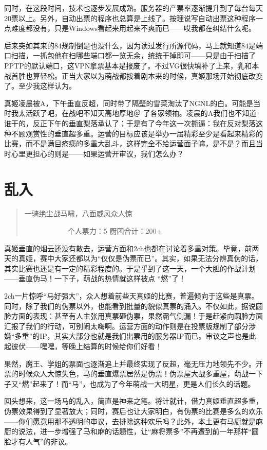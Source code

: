 同时，在这段时间，技术也逐步发展成熟。服务器的产票率逐渐提升到了每台每天20票以上。另外，自动出票的程序也总算是上线了。按理说写自动出票这种程序一点难度都没有，只是Windows看起来用起来不爽而已——哎我都在纠结什么呢。

后来突如其来的84规制倒是也没什么，因为读过发行所源代码，马上就知道84是端口扫描，一抓包他在扫哪些端口都一览无余，统统干掉即可——只是由于扫描了PPTP的默认端口，这VPN拿票基本是报废了。不过VG很快填补了上来，乳和本战首胜也算轻松。正当大家以为萌战都按着剧本来的时候，真姬那场开始彻底改变了。至少我这样认为。

真姬凌晨被A，下午垂直反超，同时带了隔壁的雪菜淘汰了NGNL的白。可能是当时我太活跃了吧，在战吧不知天高地厚地＠ 了各家领袖。凌晨的A我们也不知道谁干的，反正下午的垂直梨落承认了；于是有了今年这一次撕逼：我在反对梨落这种不顾观赏性的垂直超多重。运营的目标应该是举办一届精彩至少是看起来精彩的比赛，而不是满目疮痍的多重大乱斗，这样完全不给运营面子嘛，是不是？而且当时心里更担心的则是——如果运营开审议，我们怎么办？


\section{乱入}
\begin{quote}
一骑绝尘战马啸，八面威风众人惊

　　　　　　个人票力：5 厨团合计：200+
\end{quote}

真姬垂直的烟云还没有散去，运营方面和2ch也都在讨论着多重对策。毕竟，前两天的真姬，赛中大家还都以为“仅仅是伪票而已”。其实，如果无法分辨真伪的话，其实比赛也还是有一定的精彩程度的。于是乎到了这一天，一个大胆的作战计划——垂直伪马！一下子，萌战的热情就这样被点 “燃”了！

2ch一片惊呼“马好强大”，众人想着前些天真姬的比赛，普遍倾向于这些是真票。同时，除了我们的伪票以外，也能看到批量的貌似真票的涌入。不仅如此，据说圆脸方面的表现：甚至有人主张用真票砸伪票，果然霸气侧漏！于是赶紧向圆脸方面汇报了我们的行动，可别闹太嗨啊。运营方面的动作则是在投票版规制了部分涉嫌“多重”的IP，其实大部分也就是我们出票用的服务器IP而已。审议之声也是此起彼伏——嘿嘿，等晚上结算的时候给你们好看！

果然，魔王、学姐的票面也逐渐追上并最终实现了反超，毫无压力地领先不少。开票的时候众人大惊失色，马的垂直爆票居然是伪票！伪票屋大战多重屋，萌战一下子又“燃”起来了！而“马”，也成为了今年萌战一大明星，更是人们长久的话题。

回头想来，这一场马的乱入，简直是神来之笔。将计就计，借力真姬垂直超多重，伪票效果得到了显著放大；同时，赛后也让大家明白，有伪票的比赛是多么的欢乐——你们愿意用那不透明的审议，去排除这种欢乐吗？此外，本土更有马厨就是麻厨的说法，进一步增强了马和麻的话题性，让“麻将票多”不再遭到前一年那样“圆脸才有人气”的非议。

